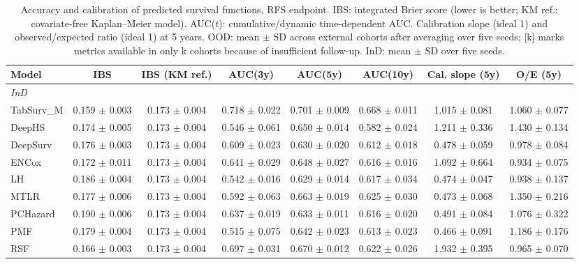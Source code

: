 \begin{table}[t]
\centering
\caption{Accuracy and calibration of predicted survival functions, RFS endpoint. IBS: integrated Brier score (lower is better; KM ref.: covariate-free Kaplan--Meier model). AUC($t$): cumulative/dynamic time-dependent AUC. Calibration slope (ideal 1) and observed/expected ratio (ideal 1) at 5 years. OOD: mean $\pm$ SD across external cohorts after averaging over five seeds; [k] marks metrics available in only k cohorts because of insufficient follow-up. InD: mean $\pm$ SD over five seeds.}
\label{tab:calibration_rfs}
\footnotesize
\setlength{\tabcolsep}{3pt}
\begin{tabular}{lccccccc}
\toprule
Model & IBS & IBS (KM ref.) & AUC(3y) & AUC(5y) & AUC(10y) & Cal. slope (5y) & O/E (5y) \\
\midrule
\multicolumn{8}{l}{\textit{InD}} \\
TabSurv\_M & 0.159 $\pm$ 0.003 & 0.173 $\pm$ 0.004 & 0.718 $\pm$ 0.022 & 0.701 $\pm$ 0.009 & 0.668 $\pm$ 0.011 & 1.015 $\pm$ 0.081 & 1.060 $\pm$ 0.077 \\
DeepHS & 0.174 $\pm$ 0.005 & 0.173 $\pm$ 0.004 & 0.546 $\pm$ 0.061 & 0.650 $\pm$ 0.014 & 0.582 $\pm$ 0.024 & 1.211 $\pm$ 0.336 & 1.430 $\pm$ 0.134 \\
DeepSurv & 0.176 $\pm$ 0.003 & 0.173 $\pm$ 0.004 & 0.609 $\pm$ 0.023 & 0.630 $\pm$ 0.020 & 0.612 $\pm$ 0.018 & 0.478 $\pm$ 0.059 & 0.978 $\pm$ 0.084 \\
ENCox & 0.172 $\pm$ 0.011 & 0.173 $\pm$ 0.004 & 0.641 $\pm$ 0.029 & 0.648 $\pm$ 0.027 & 0.616 $\pm$ 0.016 & 1.092 $\pm$ 0.664 & 0.934 $\pm$ 0.075 \\
LH & 0.186 $\pm$ 0.004 & 0.173 $\pm$ 0.004 & 0.542 $\pm$ 0.016 & 0.629 $\pm$ 0.014 & 0.617 $\pm$ 0.034 & 0.474 $\pm$ 0.047 & 0.938 $\pm$ 0.137 \\
MTLR & 0.177 $\pm$ 0.006 & 0.173 $\pm$ 0.004 & 0.592 $\pm$ 0.063 & 0.663 $\pm$ 0.019 & 0.625 $\pm$ 0.030 & 0.473 $\pm$ 0.068 & 1.350 $\pm$ 0.216 \\
PCHazard & 0.190 $\pm$ 0.006 & 0.173 $\pm$ 0.004 & 0.637 $\pm$ 0.019 & 0.633 $\pm$ 0.011 & 0.616 $\pm$ 0.020 & 0.491 $\pm$ 0.084 & 1.076 $\pm$ 0.322 \\
PMF & 0.179 $\pm$ 0.004 & 0.173 $\pm$ 0.004 & 0.515 $\pm$ 0.075 & 0.642 $\pm$ 0.023 & 0.613 $\pm$ 0.023 & 0.466 $\pm$ 0.091 & 1.186 $\pm$ 0.176 \\
RSF & 0.166 $\pm$ 0.003 & 0.173 $\pm$ 0.004 & 0.697 $\pm$ 0.031 & 0.670 $\pm$ 0.012 & 0.622 $\pm$ 0.026 & 1.932 $\pm$ 0.395 & 0.965 $\pm$ 0.070 \\

\end{tabular}
\end{table}
